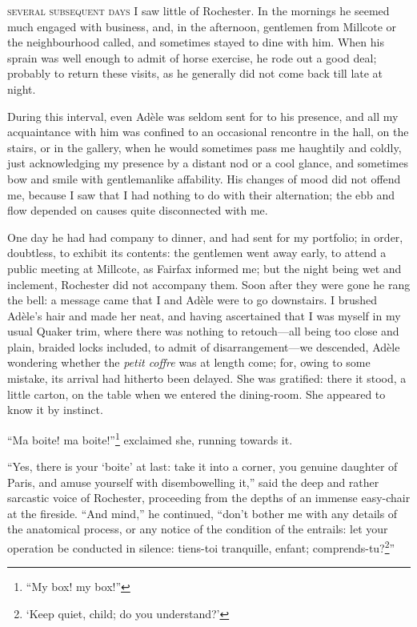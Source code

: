 
 \textsc{several subsequent days} I saw little of \Mr{} Rochester. In the
mornings he seemed much engaged with business, and, in the afternoon,
gentlemen from Millcote or the neighbourhood called, and sometimes
stayed to dine with him. When his sprain was well enough to admit of
horse exercise, he rode out a good deal; probably to return these
visits, as he generally did not come back till late at night.

During this interval, even Adèle was seldom sent for to his presence,
and all my acquaintance with him was confined to an occasional rencontre
in the hall, on the stairs, or in the gallery, when he would sometimes
pass me haughtily and coldly, just acknowledging my presence by a
distant nod or a cool glance, and sometimes bow and smile with
gentlemanlike affability. His changes of mood did not offend me,
because I saw that I had nothing to do with their alternation; the ebb
and flow depended on causes quite disconnected with me.

One day he had had company to dinner, and had sent for my portfolio; in
order, doubtless, to exhibit its contents: the gentlemen went away
early, to attend a public meeting at Millcote, as \Mrs{} Fairfax informed
me; but the night being wet and inclement, \Mr{} Rochester did not
accompany them. Soon after they were gone he rang the bell: a message
came that I and Adèle were to go downstairs. I brushed Adèle's hair and
made her neat, and having ascertained that I was myself in my usual
Quaker trim, where there was nothing to retouch---all being too close
and plain, braided locks included, to admit of disarrangement---we
descended, Adèle wondering whether the \foreignlanguage{french}{\emph{petit coffre}} was at length
come; for, owing to some mistake, its arrival had hitherto been
delayed. She was gratified: there it stood, a little carton, on the
table when we entered the dining-room. She appeared to know it by
instinct.

\foreignquote{french}{Ma boite! ma boite!}\footnote{\enquote{My box! my box!}} exclaimed she, running towards it.

\enquote{Yes, there is your \foreignquote{french}{boite} at last: take it into a
	corner, you genuine daughter of Paris, and amuse yourself with
	disembowelling it,} said the deep and rather sarcastic voice of \Mr{}
Rochester, proceeding from the depths of an immense easy-chair at the
fireside. \enquote{And mind,} he continued, \enquote{don't bother me
	with any details of the anatomical process, or any notice of the
	condition of the entrails: let your operation be conducted in silence:
	\foreignlanguage{french}{tiens-toi tranquille, enfant; comprends-tu?}\footnote{\enquote{Keep quiet, child; do you understand?}}}

